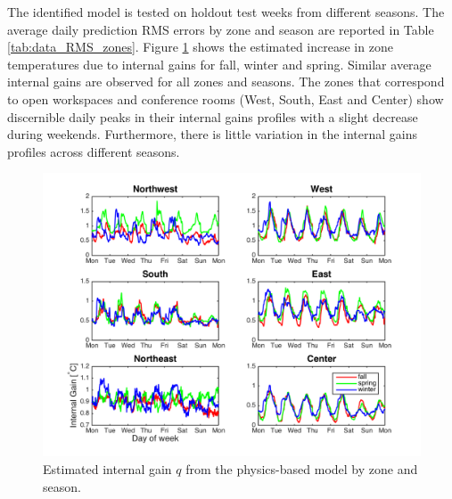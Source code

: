 The identified model is tested on holdout test weeks from different seasons. The average daily prediction RMS errors by zone and season are reported in Table \ref{tab:data_RMS_zones}. Figure \ref{fig:physics_qig} shows the estimated increase in zone temperatures due to internal gains for fall, winter and spring. %
Similar average internal gains are observed for all zones and seasons. The zones that correspond to open workspaces and conference rooms (West, South, East and Center) show discernible daily peaks in their internal gains profiles with a slight decrease during weekends. Furthermore, there is little variation in the internal gains profiles across different seasons.
\begin{figure}
	\centering
	\vspace*{-0.3cm}
	\includegraphics[width=\textwidth]{chapters/building_model/figures/physics_qig.png}
	\vspace*{-0.2cm}
	\caption{Estimated internal gain $q$ from the physics-based model by zone and season.}
	\vspace*{-0.5cm}
	\label{fig:physics_qig}
\end{figure}
